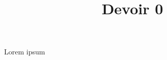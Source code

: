 \documentclass[12pt,doclabel=Devoir,solution=true]{uqtrassignment}
\title{Devoir 0}
\begin{document}
\maketitle

\begin{problem}{Lorem ipsum}

\lipsum[1]

\begin{solution}
\lipsum[2]
\end{solution}
\end{problem}
\end{document}
